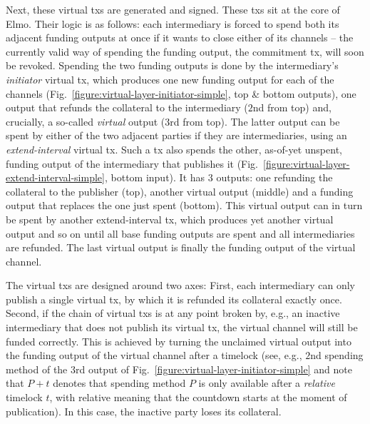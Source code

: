  Next, these virtual txs are generated and signed. These txs sit at the core of
  Elmo. Their logic is as follows: each intermediary is forced to spend both its
  adjacent funding outputs at once if it wants to close either of its channels
  -- the currently valid way of spending the funding output, the commitment tx,
  will soon be revoked. Spending the two funding outputs is done by the
  intermediary's \emph{initiator} virtual tx, which produces one new funding
  output for each of the channels
  (Fig.~\ref{figure:virtual-layer-initiator-simple}, top \& bottom outputs), one
  output that refunds the collateral to the intermediary ($2$nd from top) and,
  crucially, a so-called \emph{virtual} output ($3$rd from top). The latter
  output can be spent by either of the two adjacent parties if they are
  intermediaries, using an \emph{extend-interval} virtual tx. Such a tx also
  spends the other, as-of-yet unspent, funding output of the intermediary that
  publishes it (Fig.~\ref{figure:virtual-layer-extend-interval-simple}, bottom
  input). It has $3$ outputs: one refunding the collateral to the publisher
  (top), another virtual output (middle) and a funding output that replaces the
  one just spent (bottom). This virtual output can in turn be spent by another
  extend-interval tx, which produces yet another virtual output and so on until
  all base funding outputs are spent and all intermediaries are refunded. The
  last virtual output is finally the funding output of the virtual channel.

  The virtual txs are designed around two axes: First, each intermediary can
  only publish a single virtual tx, by which it is refunded its collateral
  exactly once. Second, if the chain of virtual txs is at any point broken by,
  e.g., an inactive intermediary that does not publish its virtual tx, the
  virtual channel will still be funded correctly. This is achieved by turning
  the unclaimed virtual output into the funding output of the virtual channel
  after a timelock (see, e.g., $2$nd spending method of the $3$rd output of
  Fig.~\ref{figure:virtual-layer-initiator-simple} and note that $P + t$ denotes
  that spending method $P$ is only available after a \emph{relative} timelock
  $t$, with relative meaning that the countdown starts at the moment of
  publication). In this case, the inactive party loses its collateral.

